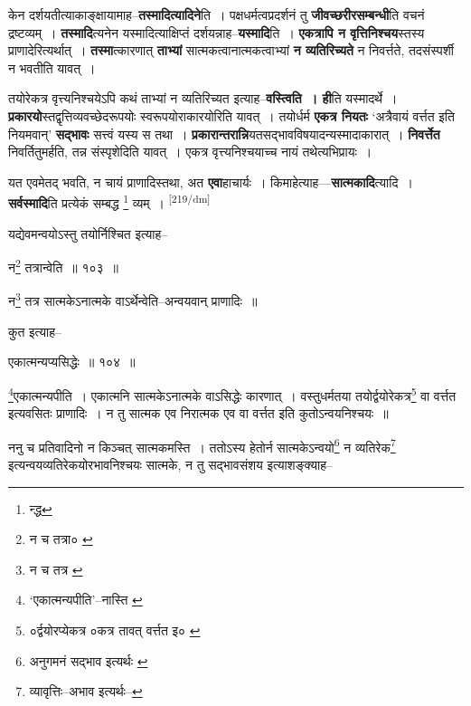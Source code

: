 \documentclass[article,12pt,a4paper]{memoir}
\begin{document}
	  \pstart केन दर्शयतीत्याकाङ्क्षायामाह--\textbf{तस्मादित्यादिने}ति । पक्षधर्मत्वप्रदर्शनं तु \textbf{जीवच्छरीरसम्बन्धी}ति वचनं द्रष्टव्यम् । \textbf{तस्मादि}त्यनेन यस्मादित्याक्षिप्तं दर्शयन्नाह--\textbf{यस्मादि}ति । \textbf{एकत्रापि न वृत्तिनिश्चय}स्तस्य प्राणादेरित्यर्थात् । \textbf{तस्मा}त्कारणात् \textbf{ताभ्यां} सात्मकत्वानात्मकत्वाभ्यां \textbf{न व्यतिरिच्यते} न निवर्त्तते, तदसंस्पर्शी न भवतीति यावत् ।
	\pend
      

	  \pstart तयोरेकत्र वृत्त्यनिश्चयेऽपि कथं ताभ्यां न व्यतिरिच्यत इत्याह--\textbf{वस्त्विति । ही}ति यस्मादर्थे । \textbf{प्रकारयो}स्तद्वृत्तिव्यवच्छेदरूपयोः स्वरूपयोराकारयोरिति यावत् । तयोर्धर्म \textbf{एकत्र नियतः} ‘अत्रैवायं वर्त्तत इति नियमवान्’ \textbf{सद्भावः} सत्त्वं यस्य स तथा । \textbf{प्रकारान्तरान्नि}यतसद्भावविषयादन्यस्मादाकारात् । \textbf{निवर्त्तेत} निवर्तितुमर्हति, तन्न संस्पृशेदिति यावत् । एकत्र वृत्त्यनिश्चयाच्च नायं तथेत्यभिप्रायः ।
	\pend
      

	  \pstart यत एवमेतद् भवति, न चायं प्राणादिस्तथा, अत \textbf{एवा}हाचार्यः । किमाहेत्याह—\textbf{सात्मकादि}त्यादि । \textbf{सर्वस्मादि}ति प्रत्येकं सम्बद्ध \footnote{न्द्ध} व्यम् ।
	\pend
      \leavevmode\textsuperscript{\rmlatinfont\tiny [219/dm]}

	  \pstart यद्येवमन्वयोऽस्तु तयोर्निश्चित इत्याह--
	\pend
       

	  \pstart न\footnote{न च तत्रा० \cite{dp-msC} \cite{dp-msD}} तत्रान्वेति ॥ १०३ ॥
	\pend
       

	  \pstart न\footnote{न च तत्र \cite{dp-msD}} तत्र सात्मकेऽनात्मके वाऽर्थेन्वेति--अन्वयवान् प्राणादिः ॥
	\pend
       

	  \pstart कुत इत्याह--
	\pend
       

	  \pstart एकात्मन्यप्यसिद्धेः ॥ १०४ ॥
	\pend
       

	  \pstart \footnote{‘एकात्मन्यपीति’--नास्ति \cite{dp-msA} \cite{dp-msB} \cite{dp-msC} \cite{dp-msD} \cite{dp-edP} \cite{dp-edH} \cite{dp-edN}}एकात्मन्यपीति । एकात्मनि सात्मकेऽनात्मके वाऽसिद्धेः कारणात् । वस्तुधर्मतया तयोर्द्वयोरेकत्र\footnote{०र्द्वयोरप्येकत्र \cite{dp-msC} \cite{dp-msD} ०कत्र तावत् वर्त्तत इ० \cite{dp-msC}} वा वर्त्तत इत्यवसितः प्राणादिः । न तु सात्मक एव निरात्मक एव वा वर्त्तत इति कुतोऽन्वयनिश्चयः ॥
	\pend
       

	  \pstart ननु च प्रतिवादिनो न किञ्चत् सात्मकमस्ति । ततोऽस्य हेतोर्न सात्मकेऽन्वयो\footnote{अनुगमनं सद्भाव इत्यर्थः \cite{dp-msD-n}} न व्यतिरेक\footnote{व्यावृत्तिः--अभाव इत्यर्थः--\cite{dp-msD-n}} इत्यन्वयव्यतिरेकयोरभावनिश्चयः सात्मके, न तु सद्भावसंशय इत्याशङ्क्याह--
	\pend
       
\end{document}
